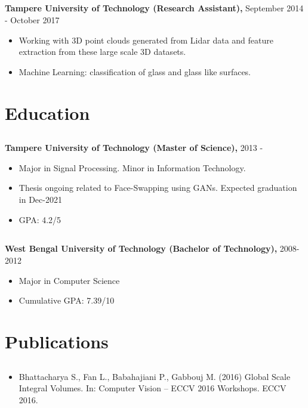 \documentclass{article}
\begin{document}
\subsection{}
\textbf{Tampere University of Technology (Research Assistant),} September 2014 -
  October 2017

\begin{itemize}[leftmargin=0.75in]
  \item Working with 3D point clouds generated from Lidar data and feature
    extraction from these large scale 3D datasets.
  \item Machine Learning: classification of glass and glass like surfaces. 
\end{itemize}

\section{Education}
\subsection{}
\textbf{Tampere University of Technology (Master of Science),} 2013 - 
\begin{itemize}[label={--}]
  \itemsep0em 
  \item Major in Signal Processing. Minor in Information Technology.
  \item Thesis ongoing related to Face-Swapping using GANs. Expected graduation in Dec-2021
  \item GPA: 4.2/5
\end{itemize}

\subsection{}
\textbf{West Bengal University of Technology (Bachelor of Technology),} 2008-2012
\begin{itemize}[label={--}]
  \itemsep0em 
  \item Major in Computer Science
  \item Cumulative GPA: 7.39/10
\end{itemize}


\section{Publications}
\subsection{}
\begin{itemize}[label={--}]
  \itemsep0em 
  \item Bhattacharya S., Fan L., Babahajiani P., Gabbouj M. (2016) Global Scale
    Integral Volumes. In: Computer Vision – ECCV 2016 Workshops. ECCV 2016.
\end{itemize}
\end{document}
